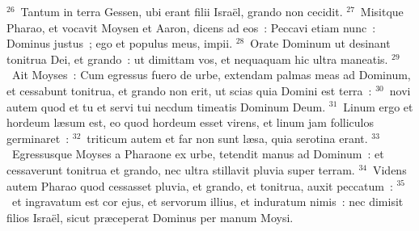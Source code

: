 ${}^{26}$~Tantum in terra Gessen, ubi erant filii Isra\"el, grando non cecidit.
${}^{27}$~Misitque Pharao, et vocavit Moysen et Aaron, dicens ad eos~: Peccavi etiam nunc~: Dominus justus~; ego et populus meus, impii.
${}^{28}$~Orate Dominum ut desinant tonitrua Dei, et grando~: ut dimittam vos, et nequaquam hic ultra maneatis.
${}^{29}$~Ait Moyses~: Cum egressus fuero de urbe, extendam palmas meas ad Dominum, et cessabunt tonitrua, et grando non erit, ut scias quia Domini est terra~:
${}^{30}$~novi autem quod et tu et servi tui necdum timeatis Dominum Deum.
${}^{31}$~Linum ergo et hordeum l\ae sum est, eo quod hordeum esset virens, et linum jam folliculos germinaret~:
${}^{32}$~triticum autem et far non sunt l\ae sa, quia serotina erant.
${}^{33}$~Egressusque Moyses a Pharaone ex urbe, tetendit manus ad Dominum~: et cessaverunt tonitrua et grando, nec ultra stillavit pluvia super terram.
${}^{34}$~Videns autem Pharao quod cessasset pluvia, et grando, et tonitrua, auxit peccatum~:
${}^{35}$~et ingravatum est cor ejus, et servorum illius, et induratum nimis~: nec dimisit filios Isra\"el, sicut pr\ae ceperat Dominus per manum Moysi.

